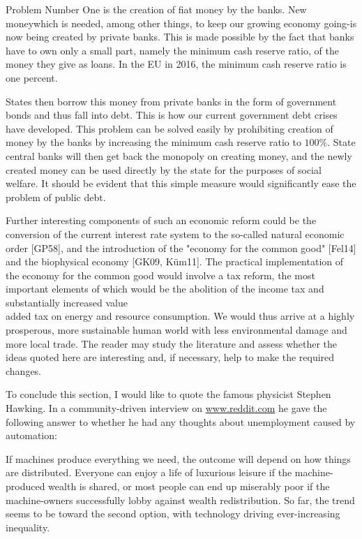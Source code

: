\documentclass[10pt]{article}
\begin{document}
Problem Number One is the creation of fiat money by the banks. New moneywhich is needed, among other things, to keep our growing economy going-is now being created by private banks. This is made possible by the fact that banks have to own only a small part, namely the minimum cash reserve ratio, of the money they give as loans. In the EU in 2016, the minimum cash reserve ratio is one percent.

States then borrow this money from private banks in the form of government bonds and thus fall into debt. This is how our current government debt crises have developed. This problem can be solved easily by prohibiting creation of money by the banks by increasing the minimum cash reserve ratio to $100 \%$. State central banks will then get back the monopoly on creating money, and the newly created money can be used directly by the state for the purposes of social welfare. It should be evident that this simple measure would significantly ease the problem of public debt.

Further interesting components of such an economic reform could be the conversion of the current interest rate system to the so-called natural economic order [GP58], and the introduction of the "economy for the common good" [Fel14] and the biophysical economy [GK09, Küm11]. The practical implementation of the economy for the common good would involve a tax reform, the most important elements of which would be the abolition of the income tax and substantially increased value\\
added tax on energy and resource consumption. We would thus arrive at a highly prosperous, more sustainable human world with less environmental damage and more local trade. The reader may study the literature and assess whether the ideas quoted here are interesting and, if necessary, help to make the required changes.


To conclude this section, I would like to quote the famous physicist Stephen Hawking. In a community-driven interview on \href{http://www.reddit.com}{www.reddit.com} he gave the following answer to whether he had any thoughts about unemployment caused by automation:

\begin{displayquote}
If machines produce everything we need, the outcome will depend on how things are distributed. Everyone can enjoy a life of luxurious leisure if the machine-produced wealth is shared, or most people can end up miserably poor if the machine-owners successfully lobby against wealth redistribution. So far, the trend seems to be toward the second option, with technology driving ever-increasing inequality.
\end{displayquote}
\end{document}
